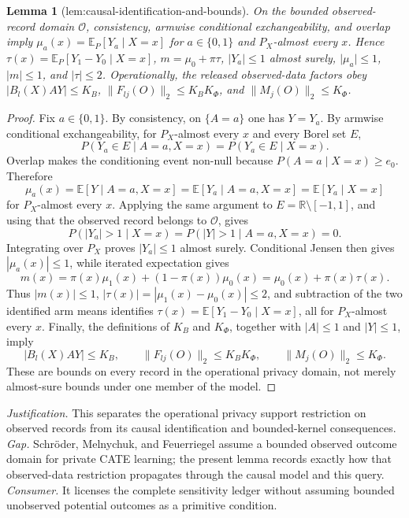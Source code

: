 \documentclass{article}
\newtheorem{lemma}{Lemma}
\begin{document}
\begin{lemma}[lem:causal-identification-and-bounds]\label{lem:causal-identification-and-bounds}
On the bounded observed-record domain \(\mathcal O\), consistency, armwise conditional exchangeability, and overlap imply \(\mu_a(x)=\mathbb E_P[Y_a\mid X=x]\) for \(a\in\{0,1\}\) and \(P_X\)-almost every \(x\). Hence \(\tau(x)=\mathbb E_P[Y_1-Y_0\mid X=x]\), \(m=\mu_0+\pi\tau\), \(\lvert Y_a\rvert\le1\) almost surely, \(\lvert\mu_a\rvert\le1\), \(\lvert m\rvert\le1\), and \(\lvert\tau\rvert\le2\). Operationally, the released observed-data factors obey \(\lvert B_l(X)A Y\rvert\le K_B\), \(\lVert F_{lj}(O)\rVert_2\le K_BK_\Phi\), and \(\lVert M_j(O)\rVert_2\le K_\Phi\).
\end{lemma}
\begin{proof}
Fix \(a\in\{0,1\}\).  By consistency, on \(\{A=a\}\) one has \(Y=Y_a\).  By armwise conditional exchangeability, for \(P_X\)-almost every \(x\) and every Borel set \(E\),
\[
 P(Y_a\in E\mid A=a,X=x)=P(Y_a\in E\mid X=x).
\]
Overlap makes the conditioning event non-null because \(P(A=a\mid X=x)\ge e_0\).  Therefore
\[
 \mu_a(x)=\mathbb E[Y\mid A=a,X=x]
 =\mathbb E[Y_a\mid A=a,X=x]
 =\mathbb E[Y_a\mid X=x]
\]
for \(P_X\)-almost every \(x\).  Applying the same argument to \(E=\mathbb R\setminus[-1,1]\), and using that the observed record belongs to \(\mathcal O\), gives
\[
 P(|Y_a|>1\mid X=x)=P(|Y|>1\mid A=a,X=x)=0.
\]
Integrating over \(P_X\) proves \(|Y_a|\le1\) almost surely.  Conditional Jensen then gives \(|\mu_a(x)|\le1\), while iterated expectation gives
\[
 m(x)=\pi(x)\mu_1(x)+(1-\pi(x))\mu_0(x)
 =\mu_0(x)+\pi(x)\tau(x).
\]
Thus \(|m(x)|\le1\), \(|\tau(x)|=|\mu_1(x)-\mu_0(x)|\le2\), and subtraction of the two identified arm means identifies \(\tau(x)=\mathbb E[Y_1-Y_0\mid X=x]\), all for \(P_X\)-almost every \(x\).  Finally, the definitions of \(K_B\) and \(K_\Phi\), together with \(|A|\le1\) and \(|Y|\le1\), imply
\[
 |B_l(X)AY|\le K_B,
 \qquad \|F_{lj}(O)\|_2\le K_BK_\Phi,
 \qquad \|M_j(O)\|_2\le K_\Phi.
\]
These are bounds on every record in the operational privacy domain, not merely almost-sure bounds under one member of the model.
\end{proof}
\par\smallskip\noindent \textit{Justification.} This separates the operational privacy support restriction on observed records from its causal identification and bounded-kernel consequences. \textit{Gap.} Schröder, Melnychuk, and Feuerriegel assume a bounded observed outcome domain for private CATE learning; the present lemma records exactly how that observed-data restriction propagates through the causal model and this query. \textit{Consumer.} It licenses the complete sensitivity ledger without assuming bounded unobserved potential outcomes as a primitive condition.
\end{document}
